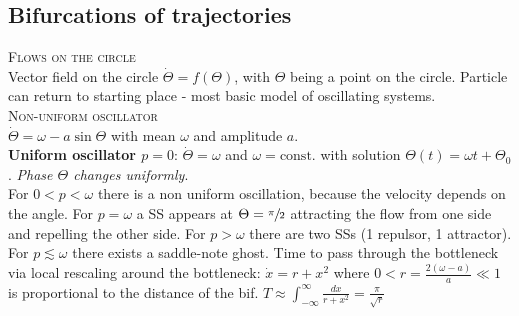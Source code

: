 \subsection{Bifurcations of trajectories}
\textsc{Flows on the circle}\\
Vector field on the circle $\dot{\Theta}=f(\Theta)$, with $\Theta$ being a point on the circle. Particle can return to starting place - most basic model of oscillating systems.\\

\textsc{Non-uniform oscillator}\\
$\dot{\Theta} = \omega - a\sin \Theta$ with mean $\omega$ and amplitude $a$.\\
\textbf{Uniform oscillator $p=0$}: $\dot{\Theta} = \omega$ and $\omega=\text{const.}$ with solution $\Theta(t)=\omega t + \Theta_0$. \emph{Phase $\Theta$ changes uniformly}.\\

For $0<p<\omega$ there is a non uniform oscillation, because the velocity depends on the angle. For $p=\omega$ a SS appears at $\Theta=\sfrac{\pi}{2}$ attracting the flow from one side and repelling the other side. For $p>\omega$ there are two SSs (1 repulsor, 1 attractor).\\
For $p\lesssim\omega$ there exists a saddle-note ghost. Time to pass through the bottleneck via local rescaling around the bottleneck: $\dot{x}=r+x^2$ where $0<r = \frac{2(\omega-a)}{a}\ll 1$ is proportional to the distance of the bif. $T\approx
\int_{-\infty}^{\infty} \frac{dx}{r+x^2} = \frac{\pi}{\sqrt{r}}$

\begin{center}
\end{center}

